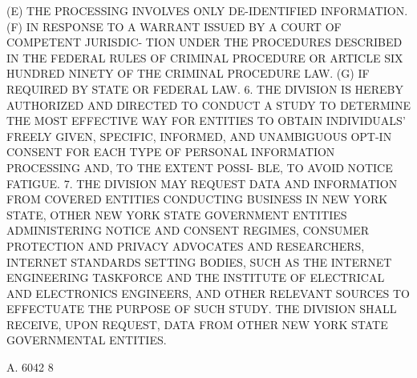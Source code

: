    (E) THE PROCESSING INVOLVES ONLY DE-IDENTIFIED INFORMATION.
   (F) IN RESPONSE TO A WARRANT ISSUED BY A COURT OF COMPETENT  JURISDIC-
 TION  UNDER  THE  PROCEDURES  DESCRIBED IN THE FEDERAL RULES OF CRIMINAL
 PROCEDURE OR ARTICLE SIX HUNDRED NINETY OF THE CRIMINAL PROCEDURE LAW.
   (G) IF REQUIRED BY STATE OR FEDERAL LAW.
   6. THE DIVISION IS HEREBY AUTHORIZED AND DIRECTED TO CONDUCT  A  STUDY
 TO  DETERMINE THE MOST EFFECTIVE WAY FOR ENTITIES TO OBTAIN INDIVIDUALS'
 FREELY GIVEN, SPECIFIC, INFORMED, AND  UNAMBIGUOUS  OPT-IN  CONSENT  FOR
 EACH  TYPE  OF PERSONAL INFORMATION PROCESSING AND, TO THE EXTENT POSSI-
 BLE, TO AVOID NOTICE FATIGUE.
   7. THE DIVISION MAY REQUEST DATA AND INFORMATION FROM COVERED ENTITIES
 CONDUCTING BUSINESS IN NEW YORK STATE, OTHER NEW YORK  STATE  GOVERNMENT
 ENTITIES  ADMINISTERING  NOTICE AND CONSENT REGIMES, CONSUMER PROTECTION
 AND  PRIVACY  ADVOCATES  AND  RESEARCHERS,  INTERNET  STANDARDS  SETTING
 BODIES,  SUCH AS THE INTERNET ENGINEERING TASKFORCE AND THE INSTITUTE OF
 ELECTRICAL AND ELECTRONICS ENGINEERS,  AND  OTHER  RELEVANT  SOURCES  TO
 EFFECTUATE  THE  PURPOSE OF SUCH STUDY. THE DIVISION SHALL RECEIVE, UPON
 REQUEST, DATA FROM OTHER NEW YORK STATE GOVERNMENTAL ENTITIES.

 A. 6042                             8
 
